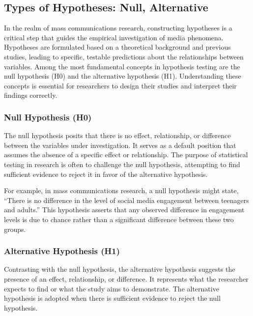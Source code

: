 \documentclass[
]{book}
\begin{document}
\hypertarget{types-of-hypotheses-null-alternative}{%
\subsection*{Types of Hypotheses: Null, Alternative}\label{types-of-hypotheses-null-alternative}}

In the realm of mass communications research, constructing hypotheses is a critical step that guides the empirical investigation of media phenomena. Hypotheses are formulated based on a theoretical background and previous studies, leading to specific, testable predictions about the relationships between variables. Among the most fundamental concepts in hypothesis testing are the null hypothesis (H0) and the alternative hypothesis (H1). Understanding these concepts is essential for researchers to design their studies and interpret their findings correctly.

\hypertarget{null-hypothesis-h0}{%
\subsubsection*{Null Hypothesis (H0)}\label{null-hypothesis-h0}}

The null hypothesis posits that there is no effect, relationship, or difference between the variables under investigation. It serves as a default position that assumes the absence of a specific effect or relationship. The purpose of statistical testing in research is often to challenge the null hypothesis, attempting to find sufficient evidence to reject it in favor of the alternative hypothesis.

For example, in mass communications research, a null hypothesis might state, ``There is no difference in the level of social media engagement between teenagers and adults.'' This hypothesis asserts that any observed difference in engagement levels is due to chance rather than a significant difference between these two groups.

\hypertarget{alternative-hypothesis-h1}{%
\subsubsection*{Alternative Hypothesis (H1)}\label{alternative-hypothesis-h1}}

Contrasting with the null hypothesis, the alternative hypothesis suggests the presence of an effect, relationship, or difference. It represents what the researcher expects to find or what the study aims to demonstrate. The alternative hypothesis is adopted when there is sufficient evidence to reject the null hypothesis.
\end{document}

